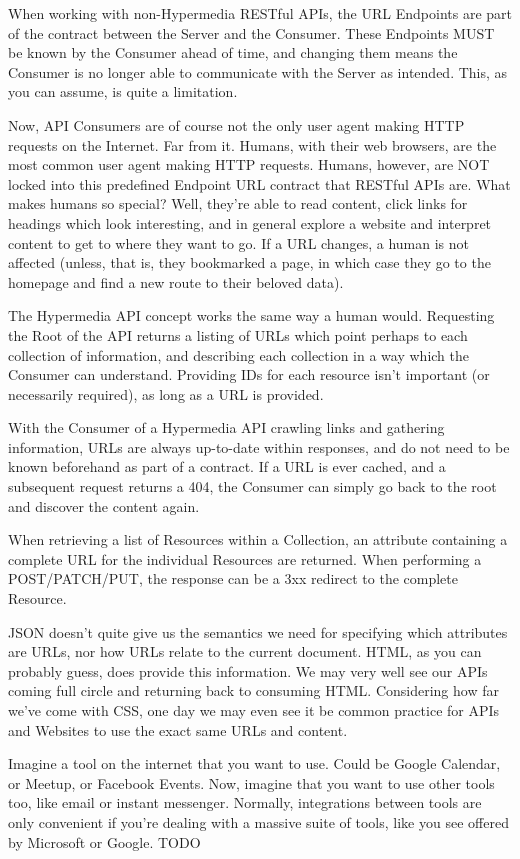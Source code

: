 \documentclass{book}
\begin{document}
When working with non-Hypermedia RESTful APIs, the URL Endpoints are part of the contract between the Server and the Consumer. These Endpoints MUST be known by the Consumer ahead of time, and changing them means the Consumer is no longer able to communicate with the Server as intended. This, as you can assume, is quite a limitation.

Now, API Consumers are of course not the only user agent making HTTP requests on the Internet. Far from it. Humans, with their web browsers, are the most common user agent making HTTP requests. Humans, however, are NOT locked into this predefined Endpoint URL contract that RESTful APIs are. What makes humans so special? Well, they're able to read content, click links for headings which look interesting, and in general explore a website and interpret content to get to where they want to go. If a URL changes, a human is not affected (unless, that is, they bookmarked a page, in which case they go to the homepage and find a new route to their beloved data).

The Hypermedia API concept works the same way a human would. Requesting the Root of the API returns a listing of URLs which point perhaps to each collection of information, and describing each collection in a way which the Consumer can understand. Providing IDs for each resource isn't important (or necessarily required), as long as a URL is provided.

With the Consumer of a Hypermedia API crawling links and gathering information, URLs are always up-to-date within responses, and do not need to be known beforehand as part of a contract. If a URL is ever cached, and a subsequent request returns a 404, the Consumer can simply go back to the root and discover the content again.

When retrieving a list of Resources within a Collection, an attribute containing a complete URL for the individual Resources are returned. When performing a POST/PATCH/PUT, the response can be a 3xx redirect to the complete Resource.

JSON doesn't quite give us the semantics we need for specifying which attributes are URLs, nor how URLs relate to the current document. HTML, as you can probably guess, does provide this information. We may very well see our APIs coming full circle and returning back to consuming HTML. Considering how far we've come with CSS, one day we may even see  it be common practice for APIs and Websites to use the exact same URLs and content.

Imagine a tool on the internet that you want to use. Could be Google Calendar, or Meetup, or Facebook Events. Now, imagine that you want to use other tools too, like email or instant messenger. Normally, integrations between tools are only convenient if you're dealing with a massive suite of tools, like you see offered by Microsoft or Google. TODO
\end{document}
